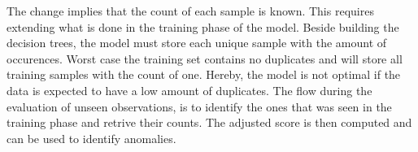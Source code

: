 The change implies that the count of each sample is known. This requires extending what is done in the training phase of the model. Beside building the decision trees, the model must store each unique sample with the amount of occurences. Worst case the training set contains no duplicates and will store all training samples with the count of one. Hereby, the model is not optimal if the data is expected to have a low amount of duplicates. The flow during the evaluation of unseen observations, is to identify the ones that was seen in the training phase and retrive their counts. The adjusted score is then computed and can be used to identify anomalies.        

% 

